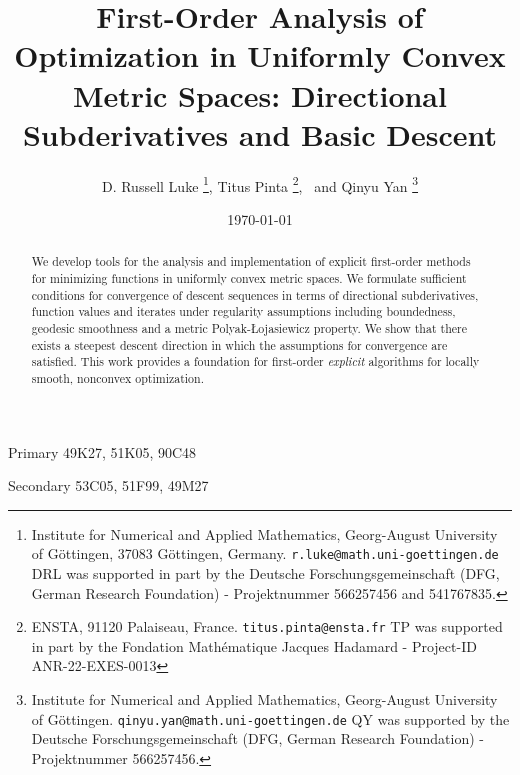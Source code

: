 \documentclass{article}
\theoremstyle{plain}\newtheorem{theorem}{Theorem}[section]
\theoremstyle{plain}\newtheorem{definition}[theorem]{Definition}
\theoremstyle{plain}\newtheorem{lemma}[theorem]{Lemma}
\theoremstyle{definition}\newtheorem{remark}[theorem]{Remark}
\theoremstyle{definition}\newtheorem{example}[theorem]{Example}
\theoremstyle{plain}\newtheorem{proposition}[theorem]{Proposition}
\theoremstyle{plain}\newtheorem{inference}[theorem]{Inference}
\theoremstyle{plain}\newtheorem{corollary}[theorem]{Corollary}
\theoremstyle{plain}\newtheorem{assumption}[theorem]{Assumption}
\begin{document}
\title{First-Order Analysis of Optimization in Uniformly Convex Metric Spaces: Directional Subderivatives and Basic Descent}
\author{D. Russell Luke
\thanks{Institute for Numerical and Applied Mathematics,
    Georg-August University of Göttingen, 37083 Göttingen, Germany. \texttt{r.luke@math.uni-goettingen.de} DRL was supported in part by the Deutsche Forschungsgemeinschaft (DFG, German Research Foundation) - Projektnummer 566257456 and 541767835.},
    Titus Pinta \thanks{ENSTA, 91120 Palaiseau, France. \texttt{titus.pinta@ensta.fr} TP was supported in part by the Fondation Mathématique Jacques Hadamard - Project-ID ANR-22-EXES-0013},~ and
    Qinyu Yan \thanks{Institute for Numerical and Applied Mathematics, Georg-August University of Göttingen. \texttt{qinyu.yan@math.uni-goettingen.de} QY was supported by the Deutsche Forschungsgemeinschaft (DFG, German Research Foundation) - Projektnummer 566257456.}
}
\date{\today}

\maketitle

\begin{abstract}
    We develop tools for the analysis and implementation of explicit first-order methods for minimizing functions in uniformly convex metric spaces.  We formulate sufficient conditions for convergence of descent sequences in terms of directional subderivatives, function values and iterates under regularity assumptions including boundedness, geodesic smoothness and a metric Polyak-Łojasiewicz property. We show that there exists a steepest descent direction in which the assumptions for convergence are satisfied. This work provides a foundation for first-order {\em explicit} algorithms for locally smooth, nonconvex optimization.
\end{abstract}


{\small {}
    Primary
    49K27,       %
    51K05,      %
    90C48       %
    

    Secondary 
    53C05,     %
    51F99,      %
    49M27       %
}
\end{document}
